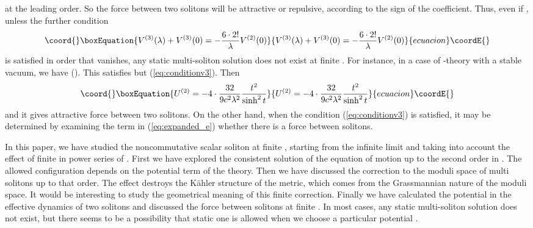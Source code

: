 \documentclass[a4paper,12pt]{article}
\begin{document}
at the leading order.
So the force between two solitons will be attractive or repulsive,
according to the sign of the coefficient.
Thus,
even if \coordHE{},
unless the further condition
\begin{equation}\coord{}\boxEquation{
V^{(3)}(\lambda)+V^{(3)}(0)=-{6\cdot 2!\over\lambda}V^{(2)}(0)
\label{eq:conditionv3}
}{
V^{(3)}(\lambda)+V^{(3)}(0)=-{6\cdot 2!\over\lambda}V^{(2)}(0)
}{ecuacion}\coordE{}\end{equation}
is satisfied in order that \coordHE{} vanishes,
any static multi-soliton solution does not exist at finite \myHighlight{$\theta$}\coordHE{}.
For instance, in a case of \coordHE{}-theory with a stable vacuum,
we have \coordHE{} (\coordHE{}).
This satisfies \coordHE{} but (\ref{eq:conditionv3}).
Then
\begin{equation}\coord{}\boxEquation{
U^{(2)}=-4\cdot {32\over 9c^2\lambda^2}{t^2\over\sinh^2 t}
}{
U^{(2)}=-4\cdot {32\over 9c^2\lambda^2}{t^2\over\sinh^2 t}
}{ecuacion}\coordE{}\end{equation}
and it gives attractive force between two solitons.
On the other hand,
when the condition (\ref{eq:conditionv3}) is satisfied,
it may be determined by examining the \coordHE{} term in (\ref{eq:expanded_e})
whether there is a force between solitons.

In this paper, we have studied
the noncommutative scalar soliton at finite \myHighlight{$\theta$}\coordHE{},
starting from the infinite \myHighlight{$\theta$}\coordHE{} limit and taking into account
the effect of finite \myHighlight{$\theta$}\coordHE{} 
in power series of \coordHE{}.
First we have explored the consistent solution
of the equation of motion up to the second order in \coordHE{}.
The allowed configuration depends on
the potential term \coordHE{} of the theory.
Then we have discussed the correction to the
moduli space of multi solitons up to that order.
The effect destroys the K\"ahler structure of the metric, which comes from
the Grassmannian nature of the moduli space.
It would be interesting to study the geometrical meaning  of
this finite \myHighlight{$\theta$}\coordHE{} correction.
Finally we have calculated the potential \coordHE{}
in the effective dynamics of two solitons
and discussed the force between solitons
at finite \myHighlight{$\theta$}\coordHE{}.
In most cases, any static multi-soliton solution does not exist,
but there seems to be a possibility that static one is allowed
when we choose a particular potential \coordHE{}.
\end{document}
